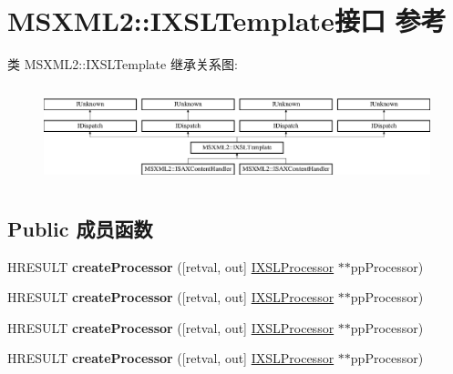 \hypertarget{interface_m_s_x_m_l2_1_1_i_x_s_l_template}{}\section{M\+S\+X\+M\+L2\+:\+:I\+X\+S\+L\+Template接口 参考}
\label{interface_m_s_x_m_l2_1_1_i_x_s_l_template}
类 M\+S\+X\+M\+L2\+:\+:I\+X\+S\+L\+Template 继承关系图\+:\begin{figure}[H]
\begin{center}
\leavevmode
\includegraphics[height=2.857143cm]{interface_m_s_x_m_l2_1_1_i_x_s_l_template}
\end{center}
\end{figure}
\subsection*{Public 成员函数}
\begin{DoxyCompactItemize}
\item 
\mbox{\label{interface_m_s_x_m_l2_1_1_i_x_s_l_template_a430235cca7f4c772dce2ecf3f483339e}} 
H\+R\+E\+S\+U\+LT {\bfseries create\+Processor} (\mbox{[}retval, out\mbox{]} \hyperlink{interface_m_s_x_m_l2_1_1_i_x_s_l_processor}{I\+X\+S\+L\+Processor} $\ast$$\ast$pp\+Processor)
\item 
\mbox{\label{interface_m_s_x_m_l2_1_1_i_x_s_l_template_a430235cca7f4c772dce2ecf3f483339e}} 
H\+R\+E\+S\+U\+LT {\bfseries create\+Processor} (\mbox{[}retval, out\mbox{]} \hyperlink{interface_m_s_x_m_l2_1_1_i_x_s_l_processor}{I\+X\+S\+L\+Processor} $\ast$$\ast$pp\+Processor)
\item 
\mbox{\label{interface_m_s_x_m_l2_1_1_i_x_s_l_template_a430235cca7f4c772dce2ecf3f483339e}} 
H\+R\+E\+S\+U\+LT {\bfseries create\+Processor} (\mbox{[}retval, out\mbox{]} \hyperlink{interface_m_s_x_m_l2_1_1_i_x_s_l_processor}{I\+X\+S\+L\+Processor} $\ast$$\ast$pp\+Processor)
\item 
\mbox{\label{interface_m_s_x_m_l2_1_1_i_x_s_l_template_a430235cca7f4c772dce2ecf3f483339e}} 
H\+R\+E\+S\+U\+LT {\bfseries create\+Processor} (\mbox{[}retval, out\mbox{]} \hyperlink{interface_m_s_x_m_l2_1_1_i_x_s_l_processor}{I\+X\+S\+L\+Processor} $\ast$$\ast$pp\+Processor)
\end{DoxyCompactItemize}

